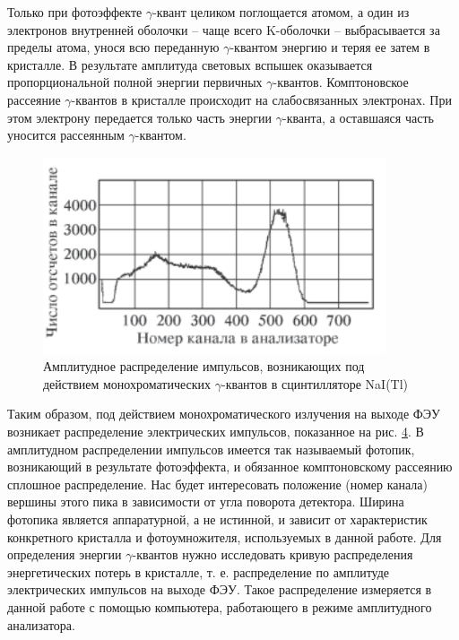 \documentclass[a4paper,12pt]{article}
\begin{document}
Только при фотоэффекте $\gamma$-квант целиком поглощается атомом, а один из электронов внутренней оболочки -- чаще всего K-оболочки -- выбрасывается за пределы атома, унося всю переданную $\gamma$-квантом энергию и теряя ее затем в кристалле. В результате амплитуда световых вспышек оказывается пропорциональной полной энергии первичных $\gamma$-квантов. Комптоновское рассеяние $\gamma$-квантов в кристалле происходит на слабосвязанных электронах. При этом электрону передается только часть энергии $\gamma$-кванта, а оставшаяся часть уносится рассеянным $\gamma$-квантом.

\begin{figure}\label{fig: Histogramm example}
    \begin{center}
    \vspace{-20pt}
        \includegraphics[width = 0.9\textwidth]{Histogramm example.png}
    \end{center}
    \caption{Амплитудное распределение импульсов, возникающих под действием монохроматических $\gamma$-квантов в сцинтилляторе NaI(Tl)}
\end{figure}
Таким образом, под действием монохроматического излучения на выходе ФЭУ возникает распределение электрических импульсов, показанное на рис. \hyperref[fig: Histogramm example]{4}. В амплитудном распределении импульсов имеется так называемый фотопик, возникающий в результате фотоэффекта, и обязанное комптоновскому рассеянию сплошное распределение. Нас будет интересовать положение (номер канала) вершины этого пика в зависимости от угла поворота детектора. Ширина фотопика является аппаратурной, а не истинной, и зависит от характеристик конкретного кристалла и фотоумножителя, используемых в данной работе. Для определения энергии $\gamma$-квантов нужно исследовать кривую распределения
энергетических потерь в кристалле, т. е. распределение по амплитуде
электрических импульсов на выходе ФЭУ. Такое распределение измеряется в данной работе с помощью компьютера, работающего в режиме амплитудного анализатора.
\end{document}
